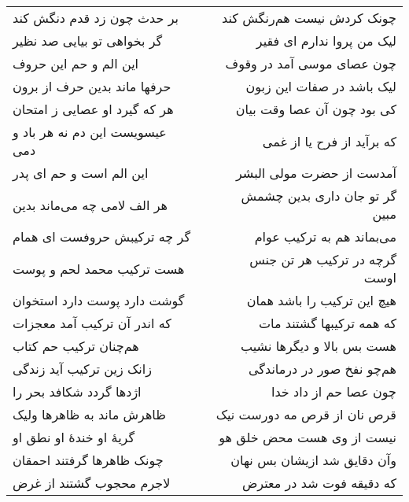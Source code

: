 \begin{center}
\begin{longtable}{l p{0.5cm} r}
بر حدث چون زد قدم دنگش کند
&&
چونک کردش نیست هم‌رنگش کند
\\
گر بخواهی تو بیایی صد نظیر
&&
لیک من پروا ندارم ای فقیر
\\
این الم و حم این حروف
&&
چون عصای موسی آمد در وقوف
\\
حرفها ماند بدین حرف از برون
&&
لیک باشد در صفات این زبون
\\
هر که گیرد او عصایی ز امتحان
&&
کی بود چون آن عصا وقت بیان
\\
عیسویست این دم نه هر باد و دمی
&&
که برآید از فرح یا از غمی
\\
این الم است و حم ای پدر
&&
آمدست از حضرت مولی البشر
\\
هر الف لامی چه می‌ماند بدین
&&
گر تو جان داری بدین چشمش مبین
\\
گر چه ترکیبش حروفست ای همام
&&
می‌بماند هم به ترکیب عوام
\\
هست ترکیب محمد لحم و پوست
&&
گرچه در ترکیب هر تن جنس اوست
\\
گوشت دارد پوست دارد استخوان
&&
هیچ این ترکیب را باشد همان
\\
که اندر آن ترکیب آمد معجزات
&&
که همه ترکیبها گشتند مات
\\
هم‌چنان ترکیب حم کتاب
&&
هست بس بالا و دیگرها نشیب
\\
زانک زین ترکیب آید زندگی
&&
هم‌چو نفخ صور در درماندگی
\\
اژدها گردد شکافد بحر را
&&
چون عصا حم از داد خدا
\\
ظاهرش ماند به ظاهرها ولیک
&&
قرص نان از قرص مه دورست نیک
\\
گریهٔ او خندهٔ او نطق او
&&
نیست از وی هست محض خلق هو
\\
چونک ظاهرها گرفتند احمقان
&&
وآن دقایق شد ازیشان بس نهان
\\
لاجرم محجوب گشتند از غرض
&&
که دقیقه فوت شد در معترض
\\
\end{longtable}
\end{center}
